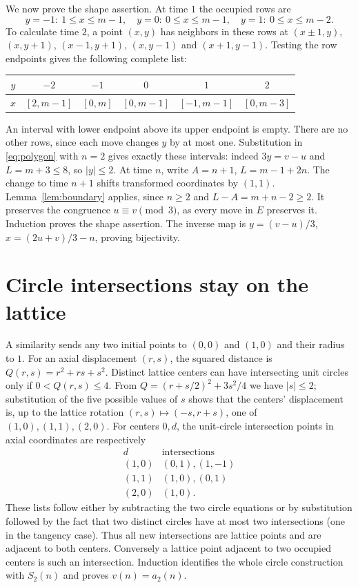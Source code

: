 \documentclass[11pt]{article}
\begin{document}
We now prove the shape assertion. At time $1$ the occupied rows are
\[
 y=-1:\ 1\leq x\leq m-1,\quad
 y=0:\ 0\leq x\leq m-1,\quad
 y=1:\ 0\leq x\leq m-2.
\]
To calculate time $2$, a point $(x,y)$ has neighbors in these rows at
$(x\pm1,y)$, $(x,y+1)$, $(x-1,y+1)$, $(x,y-1)$ and $(x+1,y-1)$.
Testing the row endpoints gives the following complete list:
\begin{center}
\begin{tabular}{c|ccccc}
$y$ & $-2$ & $-1$ & $0$ & $1$ & $2$\\
\hline
$x$ & $[2,m-1]$ & $[0,m]$ & $[0,m-1]$ & $[-1,m-1]$ & $[0,m-3]$
\end{tabular}
\end{center}
An interval with lower endpoint above its upper endpoint is empty.
There are no other rows, since each move changes $y$ by at most one.
Substitution in \eqref{eq:polygon} with $n=2$ gives exactly these intervals:
indeed $3y=v-u$ and $L=m+3\leq8$, so $|y|\leq2$.
At time $n$, write $A=n+1$, $L=m-1+2n$. The change to time $n+1$ shifts
transformed coordinates by $(1,1)$. Lemma~\ref{lem:boundary} applies,
since $n\geq2$ and $L-A=m+n-2\geq2$.
It preserves the congruence $u\equiv v\pmod3$, as every move in $E$
preserves it. Induction proves the shape assertion. The inverse map is
$y=(v-u)/3$, $x=(2u+v)/3-n$, proving bijectivity.

\section{Circle intersections stay on the lattice}
A similarity sends any two initial points to $(0,0)$ and $(1,0)$ and their
radius to $1$. For an axial displacement $(r,s)$, the squared distance is
$Q(r,s)=r^2+rs+s^2$. Distinct lattice centers can have intersecting unit
circles only if $0<Q(r,s)\leq4$. From
$Q=(r+s/2)^2+3s^2/4$ we have $|s|\leq2$; substitution of the five possible
values of $s$ shows that the centers' displacement is, up to the lattice
rotation $(r,s)\mapsto(-s,r+s)$, one of $(1,0),(1,1),(2,0)$.
For centers $0,d$, the unit-circle intersection points in axial coordinates
are respectively
\[
\begin{array}{c|c}
d&\text{intersections}\\\hline
(1,0)&(0,1),(1,-1)\\
(1,1)&(1,0),(0,1)\\
(2,0)&(1,0).
\end{array}
\]
These lists follow either by subtracting the two circle equations or by
substitution followed by the fact that two distinct circles have at most
two intersections (one in the tangency case).
Thus all new intersections are lattice points and are adjacent to both
centers. Conversely a lattice point adjacent to two occupied centers is
such an intersection. Induction identifies the whole circle construction
with $S_2(n)$ and proves $v(n)=a_2(n)$.
\end{document}
